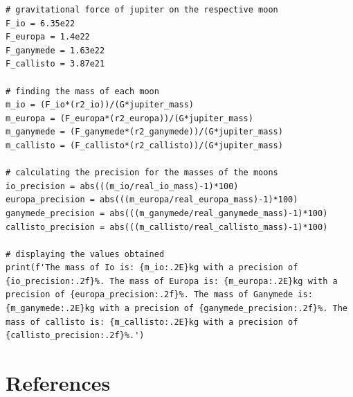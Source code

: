 \documentclass[12pt, a4paper]{article}
\begin{document}
\begin{verbatim}
# gravitational force of jupiter on the respective moon
F_io = 6.35e22
F_europa = 1.4e22
F_ganymede = 1.63e22
F_callisto = 3.87e21

# finding the mass of each moon
m_io = (F_io*(r2_io))/(G*jupiter_mass)
m_europa = (F_europa*(r2_europa))/(G*jupiter_mass)
m_ganymede = (F_ganymede*(r2_ganymede))/(G*jupiter_mass)
m_callisto = (F_callisto*(r2_callisto))/(G*jupiter_mass)

# calculating the precision for the masses of the moons
io_precision = abs(((m_io/real_io_mass)-1)*100)
europa_precision = abs(((m_europa/real_europa_mass)-1)*100)
ganymede_precision = abs(((m_ganymede/real_ganymede_mass)-1)*100)
callisto_precision = abs(((m_callisto/real_callisto_mass)-1)*100)

# displaying the values obtained
print(f'The mass of Io is: {m_io:.2E}kg with a precision of {io_precision:.2f}%. The mass of Europa is: {m_europa:.2E}kg with a precision of {europa_precision:.2f}%. The mass of Ganymede is: {m_ganymede:.2E}kg with a precision of {ganymede_precision:.2f}%. The mass of callisto is: {m_callisto:.2E}kg with a precision of {callisto_precision:.2f}%.')
\end{verbatim}

\section{References}
\printbibliography[heading = none]
\end{document}
